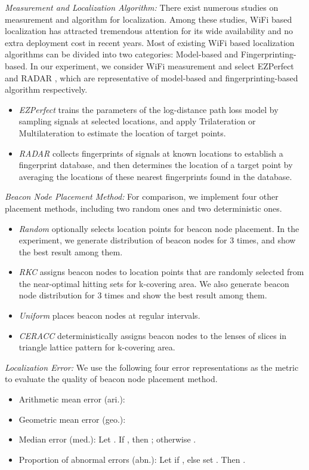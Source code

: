 \documentclass[10pt, conference, letterpaper]{IEEEtran}
\begin{document}
\emph{Measurement and Localization Algorithm:} There exist numerous studies on measurement and algorithm for localization. Among these studies, WiFi based localization has attracted tremendous attention for its wide availability and no extra deployment cost in recent years. Most of existing WiFi based localization algorithms can be divided into two categories: Model-based and Fingerprinting-based. In our experiment, we consider WiFi measurement and select EZPerfect \cite{EZPerfect10}\cite{EZPerfect12} and RADAR \cite{RADAR00}, which are representative of model-based and fingerprinting-based algorithm respectively.
\begin{itemize}
  \item \emph{EZPerfect} trains the parameters of the log-distance path loss model by sampling signals at selected locations, and apply Trilateration or Multilateration to estimate the location of target points.
  \item \emph{RADAR} collects fingerprints of signals at known locations to establish a fingerprint database, and then determines the location of a target point by averaging the locations of these nearest fingerprints found in the database.
\end{itemize}

\emph{Beacon Node Placement Method:} For comparison, we implement four other placement methods, including two random ones and two deterministic ones.
\begin{itemize}
  \item \emph{Random} optionally selects location points for beacon node placement. In the experiment, we generate distribution of beacon nodes for 3 times, and show the best result among them.
  \item \emph{RKC} \cite{RKC07} assigns beacon nodes to location points that are randomly selected from the near-optimal hitting sets for k-covering area. We also generate beacon node distribution for 3 times and show the best result among them.
  \item \emph{Uniform} places beacon nodes at regular intervals.
  \item \emph{CERACC} \cite{CERACC12} deterministically assigns beacon nodes to the lenses of slices in triangle lattice pattern for k-covering area.
\end{itemize}

\emph{Localization Error:} We use the following four error representations as the metric to evaluate the quality of beacon node placement method.
\begin{itemize}
  \item Arithmetic mean error (ari.): 
  \iffalse
  
  \fi
  \item Geometric mean error (geo.): 
  \item Median error (med.): Let . If , then ; otherwise .
  \item Proportion of abnormal errors (abn.): Let  if , else set . Then .
\end{itemize}
\end{document}
